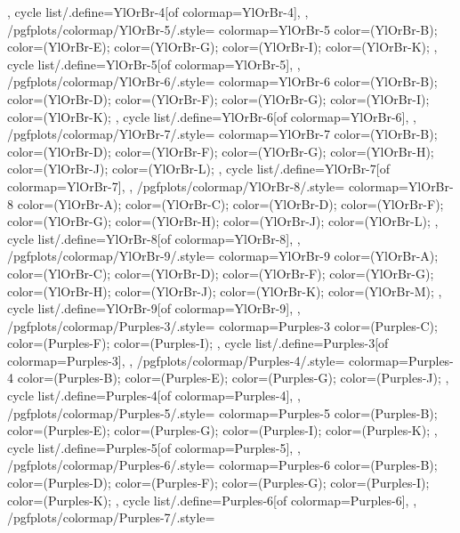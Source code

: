 {{{    },
    cycle list/.define={YlOrBr-4}{[of colormap=YlOrBr-4]},
  },
  /pgfplots/colormap/YlOrBr-5/.style={
    colormap={YlOrBr-5}{
      color=(YlOrBr-B);
      color=(YlOrBr-E);
      color=(YlOrBr-G);
      color=(YlOrBr-I);
      color=(YlOrBr-K);
    },
    cycle list/.define={YlOrBr-5}{[of colormap=YlOrBr-5]},
  },
  /pgfplots/colormap/YlOrBr-6/.style={
    colormap={YlOrBr-6}{
      color=(YlOrBr-B);
      color=(YlOrBr-D);
      color=(YlOrBr-F);
      color=(YlOrBr-G);
      color=(YlOrBr-I);
      color=(YlOrBr-K);
    },
    cycle list/.define={YlOrBr-6}{[of colormap=YlOrBr-6]},
  },
  /pgfplots/colormap/YlOrBr-7/.style={
    colormap={YlOrBr-7}{
      color=(YlOrBr-B);
      color=(YlOrBr-D);
      color=(YlOrBr-F);
      color=(YlOrBr-G);
      color=(YlOrBr-H);
      color=(YlOrBr-J);
      color=(YlOrBr-L);
    },
    cycle list/.define={YlOrBr-7}{[of colormap=YlOrBr-7]},
  },
  /pgfplots/colormap/YlOrBr-8/.style={
    colormap={YlOrBr-8}{
      color=(YlOrBr-A);
      color=(YlOrBr-C);
      color=(YlOrBr-D);
      color=(YlOrBr-F);
      color=(YlOrBr-G);
      color=(YlOrBr-H);
      color=(YlOrBr-J);
      color=(YlOrBr-L);
    },
    cycle list/.define={YlOrBr-8}{[of colormap=YlOrBr-8]},
  },
  /pgfplots/colormap/YlOrBr-9/.style={
    colormap={YlOrBr-9}{
      color=(YlOrBr-A);
      color=(YlOrBr-C);
      color=(YlOrBr-D);
      color=(YlOrBr-F);
      color=(YlOrBr-G);
      color=(YlOrBr-H);
      color=(YlOrBr-J);
      color=(YlOrBr-K);
      color=(YlOrBr-M);
    },
    cycle list/.define={YlOrBr-9}{[of colormap=YlOrBr-9]},
  },
  /pgfplots/colormap/Purples-3/.style={
    colormap={Purples-3}{
      color=(Purples-C);
      color=(Purples-F);
      color=(Purples-I);
    },
    cycle list/.define={Purples-3}{[of colormap=Purples-3]},
  },
  /pgfplots/colormap/Purples-4/.style={
    colormap={Purples-4}{
      color=(Purples-B);
      color=(Purples-E);
      color=(Purples-G);
      color=(Purples-J);
    },
    cycle list/.define={Purples-4}{[of colormap=Purples-4]},
  },
  /pgfplots/colormap/Purples-5/.style={
    colormap={Purples-5}{
      color=(Purples-B);
      color=(Purples-E);
      color=(Purples-G);
      color=(Purples-I);
      color=(Purples-K);
    },
    cycle list/.define={Purples-5}{[of colormap=Purples-5]},
  },
  /pgfplots/colormap/Purples-6/.style={
    colormap={Purples-6}{
      color=(Purples-B);
      color=(Purples-D);
      color=(Purples-F);
      color=(Purples-G);
      color=(Purples-I);
      color=(Purples-K);
    },
    cycle list/.define={Purples-6}{[of colormap=Purples-6]},
  },
  /pgfplots/colormap/Purples-7/.style={
}}
